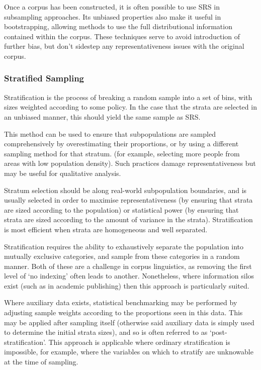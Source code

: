 Once a corpus has been constructed, it is often possible to use SRS in subsampling approaches.  Its unbiased properties also make it useful in bootstrapping, allowing methods to use the full distributional information contained within the corpus\cite{gries2006exploring}.  These techniques serve to avoid introduction of further bias, but don't sidestep any representativeness issues with the original corpus.


\subsubsection{Stratified Sampling}
Stratification is the process of breaking a random sample into a set of bins, with sizes weighted according to some policy.  In the case that the strata are selected in an unbiased manner, this should yield the same sample as SRS.

This method can be used to ensure that subpopulations are sampled comprehensively by overestimating their proportions, or by using a different sampling method for that stratum.  (for example, selecting more people from areas with low population density).  Such practices damage representativeness but may be useful for qualitative analysis\cite{trost1986qualitative}.

Stratum selection should be along real-world subpopulation boundaries, and is usually selected in order to maximise representativeness (by ensuring that strata are sized according to the population) or statistical power (by ensuring that strata are sized according to the amount of variance in the strata).  Stratification is most efficient when strata are homogeneous and well separated.

Stratification requires the ability to exhaustively separate the population into mutually exclusive categories, and sample from these categories in a random manner.  Both of these are a challenge in corpus linguistics, as removing the first level of `no indexing' often leads to another.  Nonetheless, where information silos exist (such as in academic publishing) then this approach is particularly suited\cite{rossi2013handbook}.

Where auxiliary data exists, statistical benchmarking may be performed by adjusting sample weights according to the proportions seen in this data.  This may be applied after sampling itself (otherwise said auxiliary data is simply used to determine the initial strata sizes), and so is often referred to as `post-stratification'.  This approach is applicable where ordinary stratification is impossible, for example, where the variables on which to stratify are unknowable at the time of sampling.


